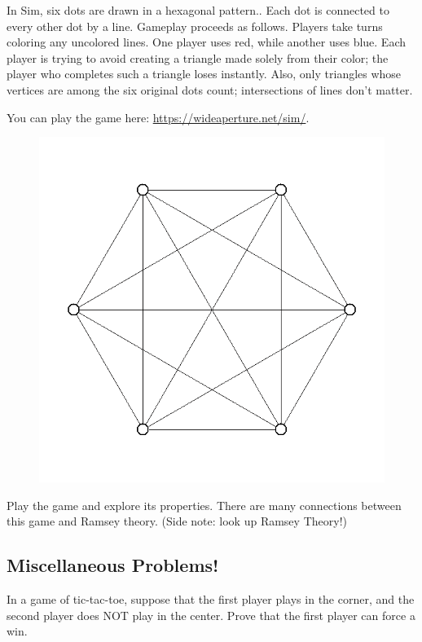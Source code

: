 \documentclass{article}
\begin{document}
In Sim, six dots are drawn in a hexagonal pattern..
Each dot is connected to every other dot by a line.
Gameplay proceeds as follows.
Players take turns coloring any uncolored lines.
One player uses red, while another uses blue.
Each player is trying to avoid creating a triangle made solely from their color; the player who completes such a triangle loses instantly.
Also, only triangles whose vertices are among the six original dots count; intersections of lines don't matter.

You can play the game here: \url{https://wideaperture.net/sim/}.

\begin{figure}[hbt!]
    \small
    \centering
    \includegraphics[scale = 0.19]{Pics/snek.png}
\end{figure}

\begin{exercise}
    Play the game and explore its properties.
    There are many connections between this game and Ramsey theory. (Side note: look up Ramsey Theory!)
\end{exercise}

\subsection{Miscellaneous Problems!}
\begin{exercise}
    In a game of tic-tac-toe, suppose that the first player plays in the corner, and the second player does NOT play in the center.
    Prove that the first player can force a win.
\end{exercise}
\end{document}
